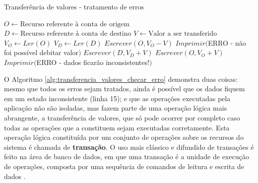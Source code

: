 \documentclass[11pt,twoside,a4paper]{book}
\begin{document}
\begin{algorithm}
\caption{Transferência de valores - tratamento de erros}
\label{alg:transferencia_valores_checar_erro}
\begin{algorithmic}[1]
\State $O \gets \text{Recurso referente à conta de origem}$
\State $D \gets \text{Recurso referente à conta de destino}$
\State $V \gets \text{Valor a ser transferido}$
\State $V_O \gets Ler(O)$
    \State $V_D \gets Ler(D)$
    \State $Escrever(O, V_O - V)$
        \State $Imprimir($ERRO - não foi possível debitar valor$)$
    \Else
        \State $Escrever(D, V_D + V)$
            \State $Escrever(O, V_O + V)$
                \State $Imprimir($ERRO - dados ficarão inconsistentes!$)$
            \EndIf
        \EndIf
    \EndIf
\EndIf
\end{algorithmic}
\end{algorithm}

O Algoritmo \ref{alg:transferencia_valores_checar_erro} demonstra duas coisas: mesmo que todos os erros sejam tratados, ainda é possível que os dados fiquem em um estado inconsistente (linha 15); e que as operações executadas pela aplicação não são isoladas, mas fazem parte de uma operação lógica mais abrangente, a transferência de valores, que só pode ocorrer por completo caso todas as operações que a constituem sejam executadas corretamente. Esta operação lógica constituída por um conjunto de operações sobre os recursos do sistema é chamada de \textbf{transação}. O uso mais clássico e difundido de transações é feito na área de banco de dados, em que uma transação é a unidade de execução de operações, composta por uma sequência de comandos de leitura e escrita de dados \cite{garcia-molina, vaca}.

\end{document}
